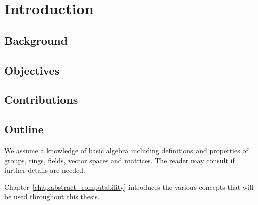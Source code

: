 \chapter{Introduction}
\section{Background}
\label{sec:background}

\section{Objectives}
\label{sec:objectives}

\section{Contributions}
\label{sec:contributions}


\section{Outline} %
\label{sec:outline}

We assume a knowledge of basic algebra including definitions and properties of groups, rings,
fields, vector spaces and matrices. The reader may consult \cite{lang:algebra} if further details
are needed.

Chapter~\ref{chap:abstract_computability} introduces the various concepts that will be used
throughout this thesis.



